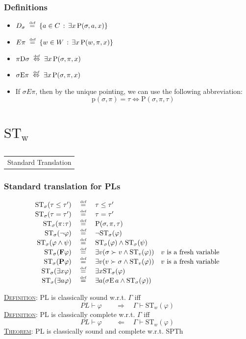 \documentclass[xcolor=x11names]{beamer}
\makeatletter
\let\beamer@writeslidentry@miniframeson=\beamer@writeslidentry
\def\beamer@writeslidentry@miniframesoff{%
  \expandafter\beamer@ifempty\expandafter{\beamer@framestartpage}{}%
  {%
    \clearpage\beamer@notesactions%
  }
}
\newcommand*{\miniframeson}{\let\beamer@writeslidentry=\beamer@writeslidentry@miniframeson}
\newcommand*{\miniframesoff}{\let\beamer@writeslidentry=\beamer@writeslidentry@miniframesoff}
\newcommand{\cimdia}[1] {\miniframesoff \begin{frame}\begin{center}\huge \begin{tabular}{c}#1\end{tabular}\end{center}\end{frame}\miniframeson}
\newcommand{\szakasz}[2][]{\section{#1}\subsection{}\cimdia{#2}}
\newcommand{\dzsa}[1]{\textsc{\underline{#1}}:}
\newcommand{\bemph}[1] {{\color{DeepSkyBlue3}{#1}}}
\newcommand{\FD}{\mathbf F}
\newcommand{\PD}{\mathbf P}
\newcommand{\past}{\succ}
\newcommand{\defegy}[1][.1]{\hspace{#1cm}\overset{\textup{\tiny def}}{=}\hspace{#1cm}}
\newcommand{\defekv}[1][.1]{\hspace{#1cm}\overset{\textup{\tiny def}}{ \Leftrightarrow }\hspace{#1cm}}
\newcommand{\points}[1][0]{\hspace{#1ex}\hspace{-.5ex}:\hspace{-.5ex}\hspace{#1ex}}
\newcommand{\Points}{\mathrm{P}}
\newcommand{\Pointsf}{\mathrm{p}}
\newcommand{\Ex}{\mathrm{E}}
\makeatother
\begin{document}
\begin{frame}
	\frametitle{Definitions}
\footnotesize
\begin{itemize}
\item $D_\sigma \defegy \{ a\in C \,:\, \exists x \, \Points (\sigma,a,x)   \}$
\item $E\pi \defegy \{ w\in W \,:\, \exists x \, \Points (w,\pi,x)   \}$ \hfill \bemph{(ez lesz majd a $wline_a$)}
\item $\pi \mathrm D\sigma  \defekv \exists x \, \Points (\sigma,\pi,x) $ \hfill \bemph{(így is jelöljük még)}
\item $\sigma \Ex\pi  \defekv \exists x \, \Points (\sigma,\pi,x) $ \hfill \bemph{(így is jelöljük még)}
\item If $\sigma E\pi$, then by the unique pointing, we can use the following abbreviation:
\[ \Pointsf (\sigma, \pi) = \tau \iff \Points (\sigma, \pi, \tau) \]
\end{itemize}

\end{frame}

\szakasz[$\mathrm{ST_w}$]{Standard Translation}


\begin{frame}[t]
\frametitle{Standard translation for PLs}
\footnotesize

\[\begin{array}{rcll}
   \mathrm{ST}_{\sigma} (\tau \leq \tau') &\defegy&\tau \leq \tau'
\\ \mathrm{ST}_{\sigma} (\tau = \tau') &\defegy& \tau = \tau'
\\ \mathrm{ST}_{\sigma} (\pi \points \tau) &\defegy& \Points(\sigma, \pi, \tau)
\\ \mathrm{ST}_{\sigma} (\lnot \varphi) &\defegy& \lnot\mathrm{ST}_{\sigma} (\varphi)
\\ \mathrm{ST}_{\sigma} (\varphi \land  \psi) &\defegy& \mathrm{ST}_{\sigma} (\varphi) \land \mathrm{ST}_{\sigma} (\psi)
\\ \mathrm{ST}_{\sigma} (\FD\varphi ) &\defegy& \exists v (\sigma\past v \land \mathrm{ST}_{v} (\varphi)) &\textup{$v$ is a fresh variable}
\\ \mathrm{ST}_{\sigma} (\PD\varphi ) &\defegy& \exists v (v\past \sigma \land \mathrm{ST}_{v} (\varphi)) &\textup{$v$ is a fresh variable}
\\ \mathrm{ST}_{\sigma} (\exists x \varphi) &\defegy& \exists x\mathrm{ST}_{\sigma} (\varphi)
\\ \mathrm{ST}_{\sigma} (\exists a \varphi) &\defegy& \exists a( \sigma \Ex \,a \land \mathrm{ST}_{\sigma} (\varphi))
\end{array}\]

\dzsa{Definition} PL is classically sound w.r.t. $\Gamma$ iff
\[PL \vdash \varphi \qquad \Longrightarrow \quad \Gamma \vdash \mathrm{ST}_w(\varphi) \]
\dzsa{Definition} PL is classically complete w.r.t. $\Gamma$ iff
\[PL \vdash \varphi \qquad \Longleftarrow \quad \Gamma \vdash \mathrm{ST}_w(\varphi) \]
\dzsa{Theorem} PL is classically sound and complete w.r.t. SPTh
\end{frame}
\end{document}
